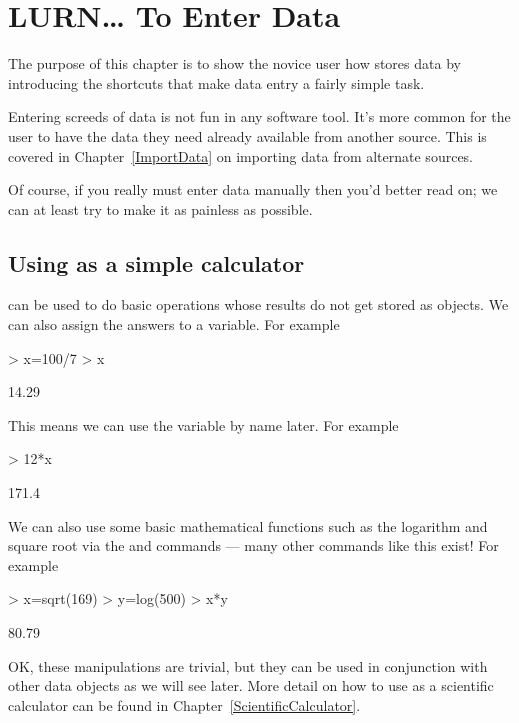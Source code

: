 

\chapter{LURN\ldots{} To Enter Data} 
\label{DataEntry} 
 
 
The purpose of this chapter is to show the novice \R{} user how \R{} stores data by introducing the shortcuts that make data entry a fairly simple task. 
 
Entering screeds of data is not fun in any software tool. It's more common for the \R{} user to have the data they need already available from another source. This is covered in Chapter~\ref{ImportData} on importing data from alternate sources. 
 
Of course, if you really must enter data manually then you'd better read on; we can at least try to make it as painless as possible. 
 
\section{Using \R{} as a simple calculator} 
\label{SimpleCalculator} 
 
\R{} can be used to do basic operations whose results do not get stored as objects. We can also assign the answers to a variable. For example 
\begin{Schunk}
\begin{Sinput}
> x=100/7 
> x 
\end{Sinput}
\begin{Soutput}
[1] 14.29
\end{Soutput}
\end{Schunk}
This means we can use the variable by name later. For example 
\begin{Schunk}
\begin{Sinput}
> 12*x 
\end{Sinput}
\begin{Soutput}
[1] 171.4
\end{Soutput}
\end{Schunk}
 
We can also use some basic mathematical functions such as the logarithm and square root via the  and  commands --- many other commands like this exist! For example 
\begin{Schunk}
\begin{Sinput}
> x=sqrt(169) 
> y=log(500) 
> x*y 
\end{Sinput}
\begin{Soutput}
[1] 80.79
\end{Soutput}
\end{Schunk}
OK, these manipulations are trivial, but they can be used in conjunction with other data objects as we will see later. More detail on how to use \R{} as a scientific calculator can be found in Chapter~\ref{ScientificCalculator}. 
 
